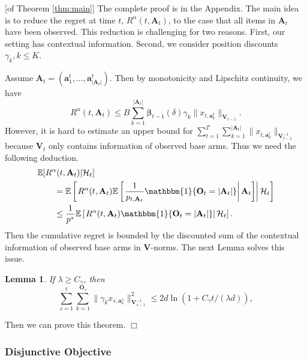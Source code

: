 \documentclass{article}
\newcommand{\bbeta}{\boldsymbol{\beta}}
\newcommand{\EE}{\mathbb{E}}
\newcommand{\bOne}{\mathbbm{1}}
\newcommand{\bA}{\mathbf{A}}
\newcommand{\ba}{\mathbf{a}}
\newcommand{\bO}{\mathbf{O}}
\newcommand{\bV}{\mathbf{V}}
\newcommand{\cH}{\mathcal{H}}
\newcommand{\abs}[1]{\left| #1 \right|}
\newcommand{\norm}[1]{\| #1 \|}
\newtheorem{lemma}[theorem]{Lemma}%
\newenvironment{proof}{\noindent {\textbf{Proof. }}}{$\Box$ \medskip}
\begin{document}
\begin{proof} [of Theorem \ref{thm:main}] %
	The complete proof is in the Appendix. The main idea is to reduce the regret at time $t$, $R^{\alpha}(t, \bA_t)$, to the case that all items in $\bA_t$ have been observed. This reduction is challenging for two reasons. First, our setting has contextual information. Second, we consider position discounts $\gamma_k, k \leq K$. 
	
	Assume $\bA_t = (\ba_1^t, \ldots, \ba_{|\bA_t|}^t)$. Then by monotonicity and Lipschitz continuity, we have
	$$
		R^{\alpha}(t, \bA_t) \leq B \sum_{k=1}^{|\bA_t|} \bbeta_{t-1}(\delta) \gamma_k \| x_{t, \ba_k^t} \|_{\bV_{t-1}}.
	$$
	However, it is hard to estimate an upper bound for $\sum_{t=1}^T \sum_{k=1}^{\abs{\bA_t}} \norm{ x_{t, \ba_k^t} }_{ \bV_{t-1}^{-1} }$ because $\bV_t$ only contains information of observed base arms. Thus we need the following deduction.
	\begin{align*}
    	&\EE[R^{\alpha}(t, \bA_t)|\cH_t] \\
    	&\qquad = \EE \left[ \left. R^{\alpha}(t, \bA_t) \EE \left[ \left. \frac{1}{p_{t, \bA_t}} \bOne\{\bO_t = \abs{\bA_t}\} \right| \bA_t \right]  \right| \cH_t \right]\\
    	&\qquad \leq \frac{1}{p^*} \EE \left[ \left. R^{\alpha}(t, \bA_t) \bOne\{\bO_t = \abs{\bA_t}\} \right| \cH_t \right].
    \end{align*}
    Then the cumulative regret is bounded by the discounted sum of the contextual information of observed base arms in $\bV$-norms. The next Lemma solves this issue.
    \begin{lemma}
    	\label{lem:XNormSumEst}
    	If $\lambda \geq C_{\gamma}$, then
    	$$
    	\sum_{s=1}^t \sum_{k=1}^{\bO_s} \norm{\gamma_k x_{s,\ba_{k}^s}}_{\bV_{s-1}^{-1}}^2 \leq 2d\ln \left(1 + C_{\gamma}t/(\lambda d)\right),
    	$$
    \end{lemma}
    Then we can prove this theorem.
\end{proof}

\subsubsection{Disjunctive Objective}
\end{document}
